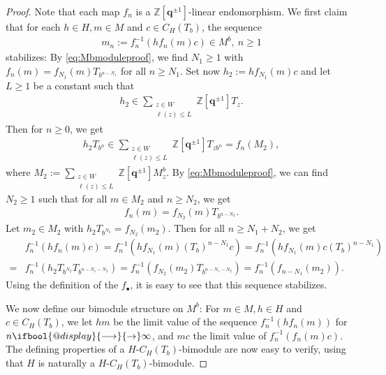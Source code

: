 \documentclass[10pt,a4paper]{amsart}
\makeatletter
\newcommand\q{\mathbf q}
\renewcommand{\to}{%
   \ifbool{@display}{\longrightarrow}{\rightarrow}%
   }
\makeatother
\begin{document}
\begin{proof}
    Note that each map $f_n$ is a $\mathbb Z[\q^{\pm 1}]$-linear endomorphism. We first claim that for each $h\in H, m\in M$ and $c\in C_H(T_b)$, the sequence
    \begin{align*}
        m_n := f_n^{-1}(hf_n(m) c)\in M^b,~n\geq 1
    \end{align*}
    stabilizes: By \eqref{eq:Mbmoduleproof}, we find $N_1\geq 1$ with $f_n(m) = f_{N_1}(m) T_{b^{n-N_1}}$ for all $n\geq N_1$. Set now $h_2 := h f_{N_1}(m) c$ and let $L\geq 1$ be a constant such that
    \begin{align*}
        h_2 \in \sum_{\substack{z\in W\\\ell(z)\leq L}} \mathbb Z[\q^{\pm 1}]T_z.
    \end{align*}
    Then for $n\geq 0$, we get
    \begin{align*}
        h_2 T_{b^n} \in \sum_{\substack{z\in W\\\ell(z)\leq L}} \mathbb Z[\q^{\pm 1}]T_{zb^n} = f_n(M_2),
    \end{align*}
    where $M_2 := \sum_{\substack{z\in W\\\ell(z)\leq L}} \mathbb Z[\q^{\pm 1}]M^b_z$. By \eqref{eq:Mbmoduleproof}, we can find $N_2\geq 1$ such that for all $m\in M_2$ and $n\geq N_2$, we get
    \begin{align*}
        f_n(m) = f_{N_2}(m) T_{b^{n-N_2}}.
    \end{align*}
    Let $m_2\in M_2$ with $h_2 T_{b^{N_2}} = f_{N_2}(m_2)$. Then for all $n\geq N_1+N_2$, we get
    \begin{align*}
        &f_n^{-1}(h f_n(m) c) = f_n^{-1}(h f_{N_1}(m) (T_b)^{n-N_1} c) = f_n^{-1}(h f_{N_1}(m) c (T_b)^{n-N_1})
        \\=&f_n^{-1}(h_2 T_{b^{N_2}} T_{b^{n-N_1-N_2}}) = f_n^{-1}(f_{N_2}(m_2) T_{b^{n-N_1-N_2}})
        =f_n^{-1}(f_{n-N_1}(m_2)).
    \end{align*}
    Using the definition of the $f_\bullet$, it is easy to see that this sequence stabilizes.

    We now define our bimodule structure on $M^b$: For $m\in M, h\in H$ and $c\in C_H(T_b)$, we let $hm$ be the limit value of the sequence $f_n^{-1}(hf_n(m))$ for $n\to \infty$, and $mc$ the limit value of $f_n^{-1}(f_n(m)c)$. The defining properties of a $H$-$C_H(T_b)$-bimodule are now easy to verify, using that $H$ is naturally a $H$-$C_H(T_b)$-bimodule.
\end{proof}
\end{document}
